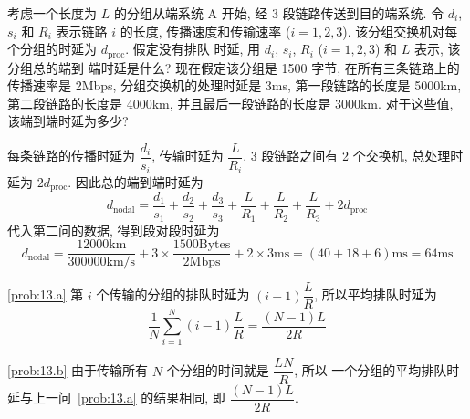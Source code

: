 \documentclass[boxes]{homework}
\begin{document}
\begin{problem}
考虑一个长度为 $L$ 的分组从端系统 A 开始, 经 3 段链路传送到目的端系统. 令
$d_{i}$, $s_{i}$ 和 $R_{i}$ 表示链路 $i$ 的长度, 传播速度和传输速率
($i = 1, 2, 3$). 该分组交换机对每个分组的时延为 $d_{\text{proc}}$. 假定没有排队
时延, 用 $d_{i}$, $s_{i}$, $R_{i}$ ($i = 1, 2, 3$) 和 $L$ 表示, 该分组总的端到
端时延是什么? 现在假定该分组是 1500 字节, 在所有三条链路上的传播速率是 2Mbps,
分组交换机的处理时延是 3ms, 第一段链路的长度是 5000km, 第二段链路的长度是
4000km, 并且最后一段链路的长度是 3000km. 对于这些值, 该端到端时延为多少?
\end{problem}
\begin{solution}
    每条链路的传播时延为 $\dfrac{ d_{i} }{ s_{i} }$, 传输时延为
    $\dfrac{ L }{ R_{i} }$. 3 段链路之间有 2 个交换机, 总处理时延为 $2
        d_{\text{proc}}$. 因此总的端到端时延为
    \begin{equation}
        d_{\text{nodal}} = \dfrac{ d_{1} }{ s_{1} } + \dfrac{ d_{2} }{ s_{2} } +
        \dfrac{ d_{3} }{ s_{3} } + \dfrac{ L }{ R_{1} } + \dfrac{ L }{ R_{2} } +
        \dfrac{ L }{ R_{3} } + 2 d_{\text{proc}}
    \end{equation}
    代入第二问的数据, 得到段对段时延为
    \begin{equation}
        d_{\text{nodal}} = \frac{ 12000\text{km} }{ 300000\text{km/s} }
        + 3 \times \frac{ 1500\text{Bytes} }{ 2\text{Mbps} } + 2 \times 3
        \text{ms} = \left( 40 + 18 + 6\right)\text{ms} = 64\text{ms}
    \end{equation}
\end{solution}

\begin{problem}
\end{problem}
\begin{solution}
    \ref{prob:13.a} 第 $i$ 个传输的分组的排队时延为 $(i - 1) \dfrac{ L }{ R }$,
    所以平均排队时延为
    \begin{equation}
        \frac{ 1 }{ N } \sum_{i = 1}^{N} (i - 1) \frac{ L }{ R } =
        \frac{ (N - 1)L }{ 2R }
    \end{equation}

    \ref{prob:13.b} 由于传输所有 $N$ 个分组的时间就是 $\dfrac{ LN }{ R }$, 所以
    一个分组的平均排队时延与上一问~\ref{prob:13.a} 的结果相同, 即
    $\dfrac{ (N - 1)L }{ 2R }$.
\end{solution}
\end{document}

